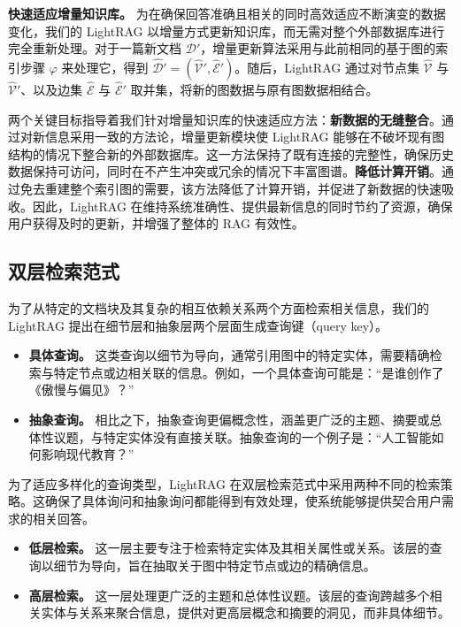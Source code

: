 \documentclass[11pt,UTF8,fontset=fandol]{ctexart}
\begin{document}
\textbf{快速适应增量知识库。} 为在确保回答准确且相关的同时高效适应不断演变的数据变化，我们的 LightRAG 以增量方式更新知识库，而无需对整个外部数据库进行完全重新处理。对于一篇新文档 $\mathcal{D}'$，增量更新算法采用与此前相同的基于图的索引步骤 $\varphi$ 来处理它，得到 $\hat{\mathcal{D}}' = (\hat{\mathcal{V}}', \hat{\mathcal{E}}')$。随后，LightRAG 通过对节点集 $\hat{\mathcal{V}}$ 与 $\hat{\mathcal{V}}'$、以及边集 $\hat{\mathcal{E}}$ 与 $\hat{\mathcal{E}}'$ 取并集，将新的图数据与原有图数据相结合。

两个关键目标指导着我们针对增量知识库的快速适应方法：\textbf{新数据的无缝整合}。通过对新信息采用一致的方法论，增量更新模块使 LightRAG 能够在不破坏现有图结构的情况下整合新的外部数据库。这一方法保持了既有连接的完整性，确保历史数据保持可访问，同时在不产生冲突或冗余的情况下丰富图谱。\textbf{降低计算开销}。通过免去重建整个索引图的需要，该方法降低了计算开销，并促进了新数据的快速吸收。因此，LightRAG 在维持系统准确性、提供最新信息的同时节约了资源，确保用户获得及时的更新，并增强了整体的 RAG 有效性。

\subsection{双层检索范式}

为了从特定的文档块及其复杂的相互依赖关系两个方面检索相关信息，我们的 LightRAG 提出在细节层和抽象层两个层面生成查询键（query key）。
\begin{itemize}[leftmargin=1.5em]
\item \textbf{具体查询。} 这类查询以细节为导向，通常引用图中的特定实体，需要精确检索与特定节点或边相关联的信息。例如，一个具体查询可能是：“是谁创作了《傲慢与偏见》？”
\item \textbf{抽象查询。} 相比之下，抽象查询更偏概念性，涵盖更广泛的主题、摘要或总体性议题，与特定实体没有直接关联。抽象查询的一个例子是：“人工智能如何影响现代教育？”
\end{itemize}

为了适应多样化的查询类型，LightRAG 在双层检索范式中采用两种不同的检索策略。这确保了具体询问和抽象询问都能得到有效处理，使系统能够提供契合用户需求的相关回答。
\begin{itemize}[leftmargin=1.5em]
\item \textbf{低层检索。} 这一层主要专注于检索特定实体及其相关属性或关系。该层的查询以细节为导向，旨在抽取关于图中特定节点或边的精确信息。
\item \textbf{高层检索。} 这一层处理更广泛的主题和总体性议题。该层的查询跨越多个相关实体与关系来聚合信息，提供对更高层概念和摘要的洞见，而非具体细节。
\end{itemize}
\end{document}
